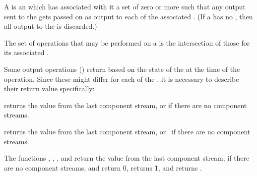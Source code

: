 A  is an   which 
has associated with it a set of zero or more   
such that any output sent to the  gets passed on
as output to each of the associated  .
(If a  has no ,
then all output to the  is discarded.)

The set of operations that may be performed on a  
is the intersection of those for its associated  .

Some output operations (\eg {}) return  based on the
state of the  at the time of the operation.
Since these  might differ for each of the ,
it is necessary to describe their return value specifically:

\beginlist

\itemitem{\bull}
     returns
    the value from the last component stream, 
    or  if there are no component streams.

\itemitem{\bull}
     returns
     the value from the last component stream, 
     or \nil\ if there are no component streams.

\itemitem{\bull}
   The functions
          ,
          ,
          ,
      and 
   return the value from the last component stream;
   if there are no component streams,
        and  return \f{0},
        returns \f{1},
   and  returns .

